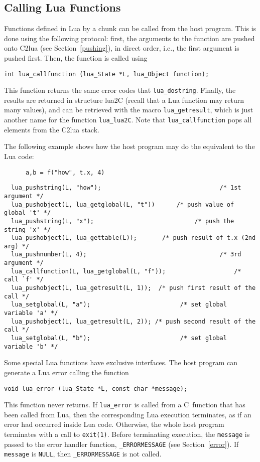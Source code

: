 \documentclass[11pt]{article}
\newcommand{\See}[1]{Section~\ref{#1}}
\newcommand{\see}[1]{(see \See{#1})}
\newcommand{\Deffunc}[1]{\index{#1}}
\begin{document}
\subsection{Calling Lua Functions}
Functions defined in Lua by a chunk
can be called from the host program.
This is done using the following protocol:
first, the arguments to the function are pushed onto C2lua
\see{pushing}, in direct order, i.e., the first argument is pushed first.
Then, the function is called using
\Deffunc{lua_callfunction}
\begin{verbatim}
int lua_callfunction (lua_State *L, lua_Object function);
\end{verbatim}
This function returns the same error codes that \verb|lua_dostring|.
Finally, the results are returned in structure lua2C
(recall that a Lua function may return many values),
and can be retrieved with the macro \verb|lua_getresult|,
\Deffunc{lua_getresult}
which is just another name for the function \verb|lua_lua2C|.
Note that \verb|lua_callfunction|
pops all elements from the C2lua stack.

The following example shows how the host program may do the
equivalent to the Lua code:
\begin{verbatim}
      a,b = f("how", t.x, 4)
\end{verbatim}
\begin{verbatim}
  lua_pushstring(L, "how");                                 /* 1st argument */
  lua_pushobject(L, lua_getglobal(L, "t"))      /* push value of global 't' */
  lua_pushstring(L, "x");                            /* push the string 'x' */
  lua_pushobject(L, lua_gettable(L));       /* push result of t.x (2nd arg) */
  lua_pushnumber(L, 4);                                     /* 3rd argument */
  lua_callfunction(L, lua_getglobal(L, "f"));                   /* call `f' */
  lua_pushobject(L, lua_getresult(L, 1));  /* push first result of the call */
  lua_setglobal(L, "a");                         /* set global variable 'a' */
  lua_pushobject(L, lua_getresult(L, 2)); /* push second result of the call */
  lua_setglobal(L, "b");                         /* set global variable 'b' */
\end{verbatim}

Some special Lua functions have exclusive interfaces.
The host program can generate a Lua error calling the function
\Deffunc{lua_error}
\begin{verbatim}
void lua_error (lua_State *L, const char *message);
\end{verbatim}
This function never returns.
If \verb|lua_error| is called from a C~function that has been called from Lua,
then the corresponding Lua execution terminates,
as if an error had occurred inside Lua code.
Otherwise, the whole host program terminates with a call to \verb|exit(1)|.
Before terminating execution,
the \verb|message| is passed to the error handler function,
\verb|_ERRORMESSAGE| \see{error}.
If \verb|message| is \verb|NULL|,
then \verb|_ERRORMESSAGE| is not called.
\end{document}
